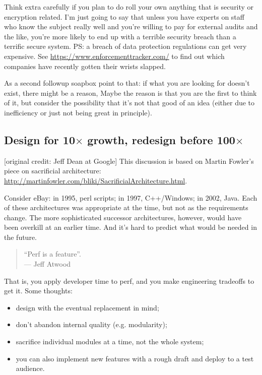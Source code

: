 \documentclass[a4paper]{report}
\begin{document}
Think extra carefully if you plan to do roll your own anything that is security or encryption related. I'm just going to say that unless you have experts on staff who know the subject really well and you're willing to pay for external audits and the like, you're more likely to end up with a terrible security breach than a terrific secure system. PS: a breach of data protection regulations can get very expensive. See \url{https://www.enforcementtracker.com/} to find out which companies have recently gotten their wrists slapped.

As a second followup soapbox point to that: if what you are looking for doesn't exist, there might be a reason, Maybe the reason is that you are the first to think of it, but consider the possibility that it's not that good of an idea (either due to inefficiency or just not being great in principle).  

\subsection*{Design for 10$\times$ growth, redesign before 100$\times$}
[original credit: Jeff Dean at Google] This discussion is based on
Martin Fowler's piece on sacrificial architecture:
\url{http://martinfowler.com/bliki/SacrificialArchitecture.html}.

Consider eBay: in 1995, perl scripts; in 1997, C++/Windows; in 2002,
Java.  Each of these architectures was appropriate at the time, but
not as the requirements change. The more sophisticated successor
architectures, however, would have been overkill at an earlier
time. And it's hard to predict what would be needed in the future.

\begin{quote}
``Perf is a feature''.\\
\hfill --- Jeff Atwood
\end{quote}
That is, you apply developer time to perf, and you make engineering tradeoffs
to get it. Some thoughts:
\begin{itemize}
\item design with the eventual replacement in mind;
\item don't abandon internal quality (e.g. modularity);
\item sacrifice individual modules at a time, not the whole system;
\item you can also implement new features with a rough draft and deploy to a test audience.
\end{itemize}
\end{document}
